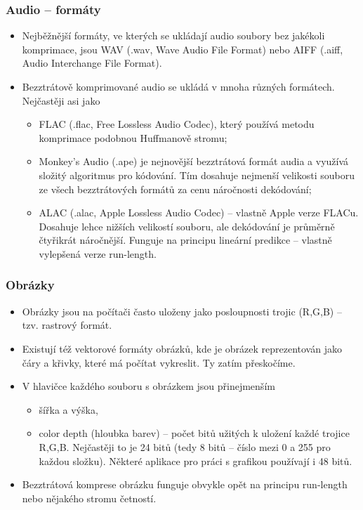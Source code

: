 \documentclass[aspectratio=169,11pt,svgnames,handout]{beamer}
\begin{document}
\begin{frame}
 \frametitle{Audio -- formáty}
 \vspace*{-1em}
 \begin{itemize}[label=\textbullet]
  \item Nejběžnější formáty, ve kterých se ukládají audio soubory \alert{bez
   jakékoli komprimace}, jsou \alert{WAV} (.wav, Wave Audio File Format) nebo
   \alert{AIFF} (.aiff, Audio Interchange File Format).
  \item Bezztrátově komprimované audio se ukládá v mnoha různých formátech.
   Nejčastěji asi jako
   \begin{itemize}[label=\textemdash]
    \item \alert{FLAC} (.flac, Free Lossless Audio Codec), který používá metodu
     komprimace podobnou Huffmanově stromu;
    \pause
    \item \alert{Monkey's Audio} (.ape) je nejnovější bezztrátová formát audia a
     využívá složitý algoritmus pro kódování. Tím dosahuje nejmenší velikosti
     souboru ze všech bezztrátových formátů za cenu náročnosti dekódování;
    \pause
    \item \alert{ALAC} (.alac, Apple Lossless Audio Codec) -- vlastně Apple
     verze FLACu. Dosahuje lehce nižších velikostí souboru, ale dekódování je
     průměrně čtyřikrát náročnější. Funguje na principu lineární predikce --
     vlastně vylepšená verze run-length.
   \end{itemize}
 \end{itemize}
\end{frame}

\begin{frame}
 \frametitle{Obrázky}
 \begin{itemize}[label=\textbullet]
  \item Obrázky jsou na počítači často uloženy jako posloupnosti trojic
   (R,G,B) -- tzv. \alert{rastrový formát}.\pause
  \item Existují též \alert{vektorové formáty} obrázků, kde je obrázek
   reprezentován jako čáry a křivky, které má počítat vykreslit. Ty zatím
   přeskočíme.
  \pause
  \item V hlavičce každého souboru s obrázkem jsou přinejmenším
  \begin{itemize}[label=\textemdash]
   \item šířka a výška,
   \pause
   \item \alert{color depth} (hloubka barev) -- počet bitů užitých k uložení
    každé trojice R,G,B. Nejčastěji to je 24 bitů (tedy 8 bitů -- číslo mezi 0 a
    255 pro každou složku). Některé aplikace pro práci s grafikou používají i 48
    bitů.
  \end{itemize}
  \pause
  \item Bezztrátová komprese obrázku funguje obvykle opět na principu run-length
   nebo nějakého stromu četností.
 \end{itemize}
\end{frame}
\end{document}
